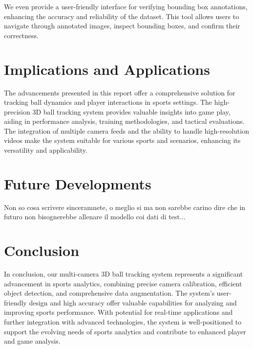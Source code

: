 \documentclass{template}
\begin{document}
We even provide a user-friendly interface for verifying bounding box annotations, enhancing the accuracy and reliability of the dataset. This tool allows users to navigate through annotated images, inspect bounding boxes, and confirm their correctness.

\section{Implications and Applications}
The advancements presented in this report offer a comprehensive solution for tracking ball dynamics and player interactions in sports settings. The high-precision 3D ball tracking system provides valuable insights into game play, aiding in performance analysis, training methodologies, and tactical evaluations. The integration of multiple camera feeds and the ability to handle high-resolution videos make the system suitable for various sports and scenarios, enhancing its versatility and applicability.

\section{Future Developments}
Non so cosa scrivere sinceramnete, o meglio si ma non sarebbe carino dire che in futuro non bisognerebbe allenare il modello coi dati di test...

\section{Conclusion}
In conclusion, our multi-camera 3D ball tracking system represents a significant advancement in sports analytics, combining precise camera calibration, efficient object detection, and comprehensive data augmentation. The system's user-friendly design and high accuracy offer valuable capabilities for analyzing and improving sports performance. With potential for real-time applications and further integration with advanced technologies, the system is well-positioned to support the evolving needs of sports analytics and contribute to enhanced player and game analysis.
\end{document}
